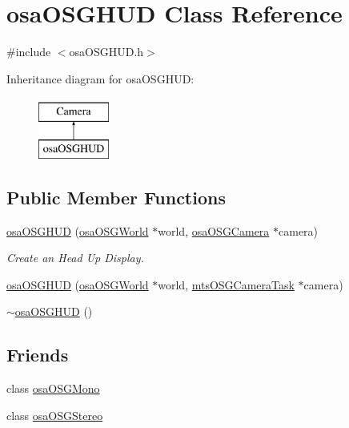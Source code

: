 \hypertarget{classosa_o_s_g_h_u_d}{}\section{osa\+O\+S\+G\+H\+U\+D Class Reference}
\label{classosa_o_s_g_h_u_d}


{\ttfamily \#include $<$osa\+O\+S\+G\+H\+U\+D.\+h$>$}

Inheritance diagram for osa\+O\+S\+G\+H\+U\+D\+:\begin{figure}[H]
\begin{center}
\leavevmode
\includegraphics[height=2.000000cm]{d1/d41/classosa_o_s_g_h_u_d}
\end{center}
\end{figure}
\subsection*{Public Member Functions}
\begin{DoxyCompactItemize}
\item 
\hyperlink{classosa_o_s_g_h_u_d_a935ac028cb72a8cee52b68b525e7ca29}{osa\+O\+S\+G\+H\+U\+D} (\hyperlink{classosa_o_s_g_world}{osa\+O\+S\+G\+World} $\ast$world, \hyperlink{classosa_o_s_g_camera}{osa\+O\+S\+G\+Camera} $\ast$camera)
\begin{DoxyCompactList}\small\item\em Create an Head Up Display. \end{DoxyCompactList}\item 
\hyperlink{classosa_o_s_g_h_u_d_acba8d1909e79c88d75e37ca54ea10cfc}{osa\+O\+S\+G\+H\+U\+D} (\hyperlink{classosa_o_s_g_world}{osa\+O\+S\+G\+World} $\ast$world, \hyperlink{classmts_o_s_g_camera_task}{mts\+O\+S\+G\+Camera\+Task} $\ast$camera)
\item 
\hyperlink{classosa_o_s_g_h_u_d_a0ff4387fe4857e21c1bc305fa6261de0}{$\sim$osa\+O\+S\+G\+H\+U\+D} ()
\end{DoxyCompactItemize}
\subsection*{Friends}
\begin{DoxyCompactItemize}
\item 
class \hyperlink{classosa_o_s_g_h_u_d_a634b1c90f4ef3f117b24b0dca82f81b9}{osa\+O\+S\+G\+Mono}
\item 
class \hyperlink{classosa_o_s_g_h_u_d_a579b6ba3b0d1fba394d73937c399dc67}{osa\+O\+S\+G\+Stereo}
\end{DoxyCompactItemize}


